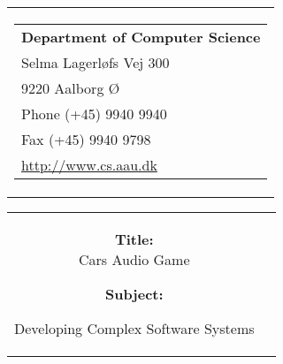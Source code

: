 \thispagestyle{empty}
\begin{titlepage}
\begin{nopagebreak}
{\samepage 
\begin{tabular}{r}
	\parbox{16cm}{
	\hfill \parbox{7cm}{\begin{tabular}{l}
		{\small \textbf{Department of Computer Science}}\\
		{\small Selma Lagerløfs Vej 300} \\
		{\small 9220 Aalborg Ø} \\
		{\small Phone (+45) 9940 9940} \\
		{\small Fax (+45) 9940 9798} \\
		{\small \url{http://www.cs.aau.dk}}
	\end{tabular}}
	}
\end{tabular}

\begin{tabular}{cc}
	\parbox{8cm}{
	\begin{description}
		\item { \textbf{Title:}}\\ 
			Cars Audio Game
    		\item { \textbf{Subject:}}\\ 
			\raggedright Developing Complex Software Systems
	\end{description}
	
}
\end{tabular}}
\end{nopagebreak}
\end{titlepage}

